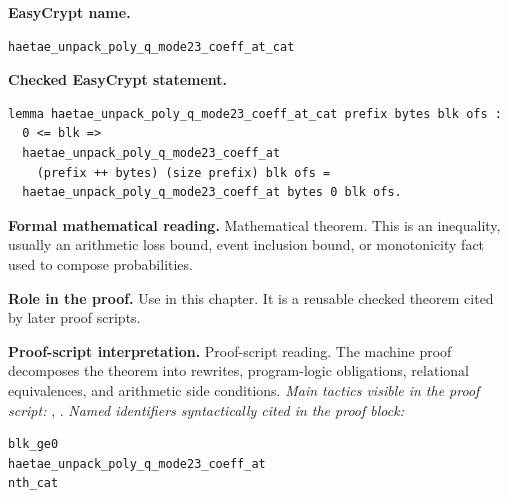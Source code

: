 \begin{formaltheorem}
\noindent\textbf{EasyCrypt name.}
\begin{lstlisting}[language=EasyCrypt,basicstyle=\ttfamily\scriptsize]
haetae_unpack_poly_q_mode23_coeff_at_cat
\end{lstlisting}
\noindent\textbf{Checked EasyCrypt statement.}
\begin{lstlisting}[language=EasyCrypt,basicstyle=\ttfamily\scriptsize]
lemma haetae_unpack_poly_q_mode23_coeff_at_cat prefix bytes blk ofs :
  0 <= blk =>
  haetae_unpack_poly_q_mode23_coeff_at
    (prefix ++ bytes) (size prefix) blk ofs =
  haetae_unpack_poly_q_mode23_coeff_at bytes 0 blk ofs.
\end{lstlisting}
\noindent\textbf{Formal mathematical reading.}
Mathematical theorem. This is an inequality, usually an arithmetic loss bound, event inclusion bound, or monotonicity fact used to compose probabilities.

\noindent\textbf{Role in the proof.}
Use in this chapter. It is a reusable checked theorem cited by later proof scripts.

\noindent\textbf{Proof-script interpretation.}
Proof-script reading. The machine proof decomposes the theorem into rewrites, program-logic obligations, relational equivalences, and arithmetic side conditions.
\emph{Main tactics visible in the proof script:} , .
\emph{Named identifiers syntactically cited in the proof block:}
\begin{lstlisting}[language=EasyCrypt,basicstyle=\ttfamily\scriptsize]
blk_ge0
haetae_unpack_poly_q_mode23_coeff_at
nth_cat
\end{lstlisting}

\end{formaltheorem}

